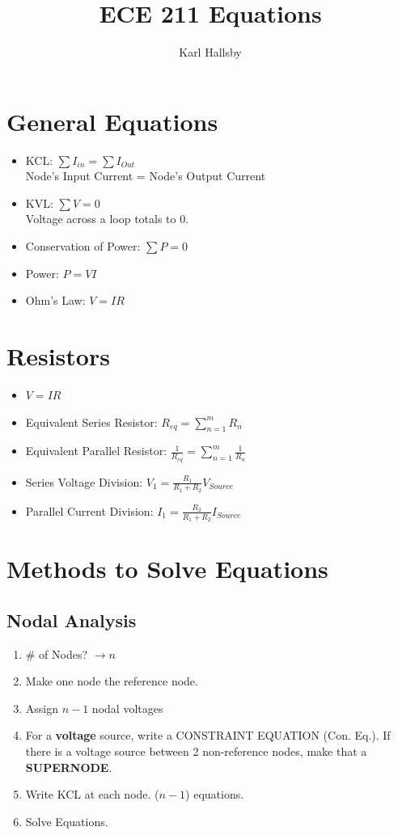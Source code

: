 \documentclass[10pt,letterpaper,final,twoside,notitlepage]{article}
\author{Karl Hallsby}
\title{ECE 211 Equations}
\begin{document}
\section*{General Equations}
	\begin{itemize}
		\item KCL: $\sum I_{in} = \sum I_{Out}$ \\
			Node's Input Current = Node's Output Current
		\item KVL: $\sum V = 0$ \\
			Voltage across a loop totals to 0.
		\item Conservation of Power: $\sum P = 0$
		\item Power: $P=VI$
		\item Ohm's Law: $V=IR$
	\end{itemize}

\section*{Resistors}
	\begin{itemize}
		\item $V=IR$
		\item Equivalent Series Resistor: $R_{eq} = \sum_{n=1}^{m}R_n$
		\item Equivalent Parallel Resistor: $\frac{1}{R_{eq}} = \sum_{n=1}^{m}\frac{1}{R_n}$
		\item Series Voltage Division: $V_1=\frac{R_1}{R_1+R_2}V_{Source}$
		\item Parallel Current Division: $I_1=\frac{R_2}{R_1+R_2}I_{Source}$
	\end{itemize}

\section*{Methods to Solve Equations}
	\subsection*{Nodal Analysis}
		\begin{enumerate}
			\item \# of Nodes? $\rightarrow n$
			\item Make one node the reference node.
			\item Assign $n-1$ nodal voltages
			\item For a \textbf{voltage} source, write a CONSTRAINT EQUATION (Con. Eq.). If there is a voltage source between 2 non-reference nodes, make that a \textbf{SUPERNODE}.
			\item Write KCL at each node. ($n-1$) equations.
			\item Solve Equations.
		\end{enumerate}
\end{document}
